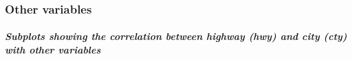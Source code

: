 \documentclass[
]{article}
\begin{document}
\hypertarget{other-variables}{%
\subsubsection{\texorpdfstring{\textbf{Other
variables}}{Other variables}}\label{other-variables}}

\hypertarget{subplots-showing-the-correlation-between-highway-hwy-and-city-cty-with-other-variables}{%
\paragraph{\texorpdfstring{\emph{Subplots showing the correlation
between highway (hwy) and city (cty) with other
variables}}{Subplots showing the correlation between highway (hwy) and city (cty) with other variables}}\label{subplots-showing-the-correlation-between-highway-hwy-and-city-cty-with-other-variables}}
\end{document}
